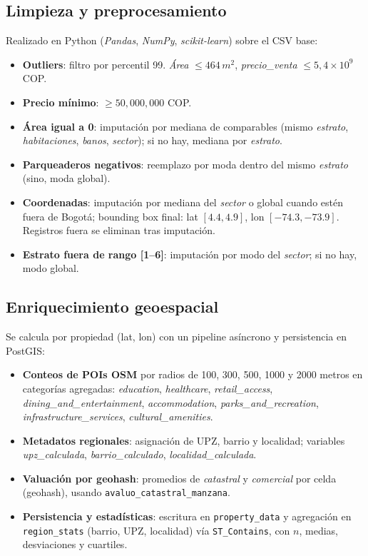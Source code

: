 \subsection*{Limpieza y preprocesamiento}
Realizado en Python (\textit{Pandas}, \textit{NumPy}, \textit{scikit-learn}) sobre el CSV base:
\begin{itemize}
    \item \textbf{Outliers}: filtro por percentil 99. \emph{Área} \(\leq 464\,m^2\), \emph{precio\_venta} \(\leq 5{,}4\times 10^9\) COP.
    \item \textbf{Precio mínimo}: \(\geq 50{,}000{,}000\) COP.
    \item \textbf{Área igual a 0}: imputación por mediana de comparables (mismo \emph{estrato}, \emph{habitaciones}, \emph{banos}, \emph{sector}); si no hay, mediana por \emph{estrato}.
    \item \textbf{Parqueaderos negativos}: reemplazo por moda dentro del mismo \emph{estrato} (sino, moda global).
    \item \textbf{Coordenadas}: imputación por mediana del \emph{sector} o global cuando estén fuera de Bogotá; bounding box final: lat \([4.4, 4.9]\), lon \([-74.3, -73.9]\). Registros fuera se eliminan tras imputación.
    \item \textbf{Estrato fuera de rango [1--6]}: imputación por modo del \emph{sector}; si no hay, modo global.
\end{itemize}

\subsection*{Enriquecimiento geoespacial}
Se calcula por propiedad (lat, lon) con un pipeline asíncrono y persistencia en PostGIS:
\begin{itemize}
    \item \textbf{Conteos de POIs OSM} por radios de 100, 300, 500, 1000 y 2000 metros en categorías agregadas: \emph{education}, \emph{healthcare}, \emph{retail\_access}, \emph{dining\_and\_entertainment}, \emph{accommodation}, \emph{parks\_and\_recreation}, \emph{infrastructure\_services}, \emph{cultural\_amenities}.
    \item \textbf{Metadatos regionales}: asignación de UPZ, barrio y localidad; variables \emph{upz\_calculada}, \emph{barrio\_calculado}, \emph{localidad\_calculada}.
    \item \textbf{Valuación por geohash}: promedios de \emph{catastral} y \emph{comercial} por celda (geohash), usando \texttt{avaluo\_catastral\_manzana}.
    \item \textbf{Persistencia y estadísticas}: escritura en \texttt{property\_data} y agregación en \texttt{region\_stats} (barrio, UPZ, localidad) vía \texttt{ST\_Contains}, con \(n\), medias, desviaciones y cuartiles.
\end{itemize}

